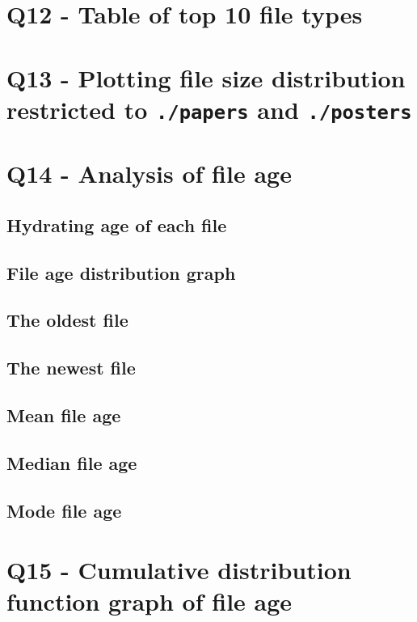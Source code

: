 \documentclass{article}
\begin{document}
\begin{figure}[htbp]
\end{figure}

\section*{Q12 - Table of top 10 file types}

\section*{Q13 - Plotting file size distribution restricted to \texttt{./papers} and \texttt{./posters}}
\section*{Q14 - Analysis of file age}
\subsection*{Hydrating age of each file}
\subsection*{File age distribution graph}
\subsection*{The oldest file}
\subsection*{The newest file}
\subsection*{Mean file age}
\subsection*{Median file age}
\subsection*{Mode file age}
\section*{Q15 - Cumulative distribution function graph of file age}

\newpage
\printbibliography
\end{document}
